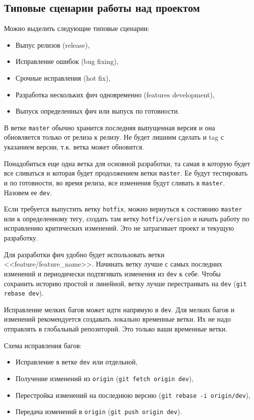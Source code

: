 \documentclass[%
	11pt,
	a4paper,
	utf8,
		]{article}
\begin{document}
\subsection{Типовые сценарии работы над проектом}

Можно выделить следующие типовые сценарии:
\begin{itemize}
	\item Выпус релизов (release),
	
	\item Исправление ошибок (bug fixing),
	
	\item Срочные исправления (hot fix),
	
	\item Разработка нескольких фич одновременно (features development),
	
	\item Выпуск определенных фич или выпуск по готовности.
\end{itemize}

В ветке \texttt{master} обычно хранится последняя выпущенная версия и она обновляется только от релиза к релизу. Не будет лишним сделать и tag с указанием версии, т.к. ветка может обновится.

Понадобиться еще одна ветка для основной разработки, та самая в которую будет все сливаться и которая будет продолжением ветки \texttt{master}. Ее будут тестировать и по готовности, во время релиза, все изменения будут сливать в \texttt{master}. Назовем ее \texttt{dev}.

Если требуется выпустить ветку \texttt{hotfix}, можно вернуться к состоянию \texttt{master} или к определенному тегу, создать там ветку \texttt{hotfix/version} и начать работу по исправлению критических изменений. Это не затрагивает проект и текущую разработку.

Для разработки фич удобно будет использовать ветки <<feature/feature\_name>>. Начинать ветку лучше с самых последних изменений и периодически подтягивать изменения из \texttt{dev} к себе. Чтобы сохранить историю простой и линейной, ветку лучше перестраивать на \texttt{dev} (\texttt{git rebase dev}).

Исправление мелких багов может идти напрямую в \texttt{dev}. Для мелких багов и изменений рекомендуется создавать локально временные ветки. Их не надо отправлять в глобальный репозиторий. Это только ваши временные ветки.

Схема исправления багов:
\begin{itemize}
	\item Исправление в ветке \texttt{dev} или отдельной,
	
	\item Получение изменений из \texttt{origin} (\texttt{git fetch origin dev}),
	
	\item Перестройка изменений на последнюю версию (\texttt{git rebase -i origin/dev}),
	
	\item Передача изменений в \texttt{origin} (\texttt{git push origin dev}).
\end{itemize}
\end{document}
